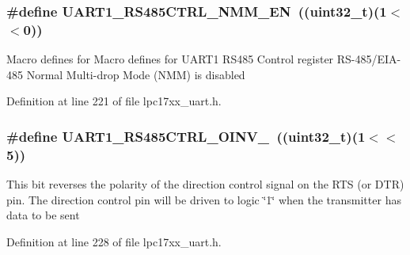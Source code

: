\hypertarget{group___u_a_r_t___private___macros_ga17e0186d392ae4cab45b95b94b325af9}{
\subsubsection[{\-U\-A\-R\-T1\-\_\-\-R\-S485\-C\-T\-R\-L\-\_\-\-N\-M\-M\-\_\-\-E\-N}]{\setlength{\rightskip}{0pt plus 5cm}\#define {\bf \-U\-A\-R\-T1\-\_\-\-R\-S485\-C\-T\-R\-L\-\_\-\-N\-M\-M\-\_\-\-E\-N}~((uint32\-\_\-t)(1$<$$<$0))}}\label{group___u_a_r_t___private___macros_ga17e0186d392ae4cab45b95b94b325af9}
\-Macro defines for \-Macro defines for \-U\-A\-R\-T1 \-R\-S485 \-Control register \-R\-S-\/485/\-E\-I\-A-\/485 \-Normal \-Multi-\/drop \-Mode (\-N\-M\-M) is disabled 

\-Definition at line 221 of file lpc17xx\-\_\-uart.\-h.

\hypertarget{group___u_a_r_t___private___macros_ga576582c10c8fc016f90b548a45e565a7}{
\subsubsection[{\-U\-A\-R\-T1\-\_\-\-R\-S485\-C\-T\-R\-L\-\_\-\-O\-I\-N\-V\-\_\-1}]{\setlength{\rightskip}{0pt plus 5cm}\#define {\bf \-U\-A\-R\-T1\-\_\-\-R\-S485\-C\-T\-R\-L\-\_\-\-O\-I\-N\-V\-\_}~((uint32\-\_\-t)(1$<$$<$5))}}\label{group___u_a_r_t___private___macros_ga576582c10c8fc016f90b548a45e565a7}
\-This bit reverses the polarity of the direction control signal on the \-R\-T\-S (or \-D\-T\-R) pin. \-The direction control pin will be driven to logic \char`\"{}1\char`\"{} when the transmitter has data to be sent 

\-Definition at line 228 of file lpc17xx\-\_\-uart.\-h.


